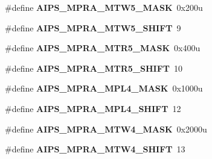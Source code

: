 \begin{DoxyCompactItemize}
\item 
\hypertarget{group___a_i_p_s___register___masks_gabd8948557054ceeee7b8284f0f41c72c}{}\#define {\bfseries A\+I\+P\+S\+\_\+\+M\+P\+R\+A\+\_\+\+M\+T\+W5\+\_\+\+M\+A\+S\+K}~0x200u\label{group___a_i_p_s___register___masks_gabd8948557054ceeee7b8284f0f41c72c}

\item 
\hypertarget{group___a_i_p_s___register___masks_gacbc18ce73a95d65e9e2534455f0c9f6d}{}\#define {\bfseries A\+I\+P\+S\+\_\+\+M\+P\+R\+A\+\_\+\+M\+T\+W5\+\_\+\+S\+H\+I\+F\+T}~9\label{group___a_i_p_s___register___masks_gacbc18ce73a95d65e9e2534455f0c9f6d}

\item 
\hypertarget{group___a_i_p_s___register___masks_gaee8e1d336f4a1b00f4277781a3f7cf12}{}\#define {\bfseries A\+I\+P\+S\+\_\+\+M\+P\+R\+A\+\_\+\+M\+T\+R5\+\_\+\+M\+A\+S\+K}~0x400u\label{group___a_i_p_s___register___masks_gaee8e1d336f4a1b00f4277781a3f7cf12}

\item 
\hypertarget{group___a_i_p_s___register___masks_ga92149f3159b90299cfe9b3f1c421273d}{}\#define {\bfseries A\+I\+P\+S\+\_\+\+M\+P\+R\+A\+\_\+\+M\+T\+R5\+\_\+\+S\+H\+I\+F\+T}~10\label{group___a_i_p_s___register___masks_ga92149f3159b90299cfe9b3f1c421273d}

\item 
\hypertarget{group___a_i_p_s___register___masks_ga7055d1f141c29ac6764a7cd38aa83a30}{}\#define {\bfseries A\+I\+P\+S\+\_\+\+M\+P\+R\+A\+\_\+\+M\+P\+L4\+\_\+\+M\+A\+S\+K}~0x1000u\label{group___a_i_p_s___register___masks_ga7055d1f141c29ac6764a7cd38aa83a30}

\item 
\hypertarget{group___a_i_p_s___register___masks_ga8e84de9fabbe7d0391efbde91421c816}{}\#define {\bfseries A\+I\+P\+S\+\_\+\+M\+P\+R\+A\+\_\+\+M\+P\+L4\+\_\+\+S\+H\+I\+F\+T}~12\label{group___a_i_p_s___register___masks_ga8e84de9fabbe7d0391efbde91421c816}

\item 
\hypertarget{group___a_i_p_s___register___masks_gaa71c596e9889226d96760d43dc4df59c}{}\#define {\bfseries A\+I\+P\+S\+\_\+\+M\+P\+R\+A\+\_\+\+M\+T\+W4\+\_\+\+M\+A\+S\+K}~0x2000u\label{group___a_i_p_s___register___masks_gaa71c596e9889226d96760d43dc4df59c}

\item 
\hypertarget{group___a_i_p_s___register___masks_ga5c44d48fc2b06c3db6d0491ceb8dfce3}{}\#define {\bfseries A\+I\+P\+S\+\_\+\+M\+P\+R\+A\+\_\+\+M\+T\+W4\+\_\+\+S\+H\+I\+F\+T}~13\label{group___a_i_p_s___register___masks_ga5c44d48fc2b06c3db6d0491ceb8dfce3}


\end{DoxyCompactItemize}
